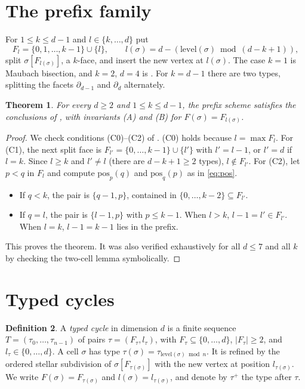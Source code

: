 \documentclass[11pt]{article}
\theoremstyle{plain}
\newtheorem{theorem}{Theorem}[section]
\theoremstyle{definition}
\newtheorem{definition}[theorem]{Definition}
\theoremstyle{remark}
\newcommand{\level}{\mathrm{level}}
\newcommand{\pos}{\mathrm{pos}}
\begin{document}
\section{The prefix family}\label{sec:prefix}

For $1\le k\le d-1$ and $l\in\{k,\dots,d\}$ put
\[
  F_l=\{0,1,\dots,k-1\}\cup\{l\},\qquad l(\sigma)=d-(\level(\sigma)\bmod(d-k+1)),
\]
split $\sigma[F_{l(\sigma)}]$, a $k$-face, and insert the new vertex at
$l(\sigma)$. The case $k=1$ is Maubach bisection, and $k=2$, $d=4$ is
. For $k=d-1$ there are two types, splitting the facets
$\partial_{d-1}$ and $\partial_d$ alternately.

\begin{theorem}\label{thm:prefix}
For every $d\ge2$ and $1\le k\le d-1$, the prefix scheme satisfies the
conclusions of , with invariants (A) and (B) for
$F(\sigma)=F_{l(\sigma)}$.
\end{theorem}

\begin{proof}
We check conditions (C0)--(C2) of . (C0) holds because
$l=\max F_l$. For (C1), the next split face is
$F_{l'}=\{0,\dots,k-1\}\cup\{l'\}$ with $l'=l-1$, or $l'=d$ if $l=k$.
Since $l\ge k$ and $l'\ne l$ (there are $d-k+1\ge2$ types), $l\notin F_{l'}$.
For (C2), let $p<q$ in $F_l$ and compute $\pos_p(q)$ and $\pos_q(p)$ as
in \eqref{eq:pos}.
\begin{itemize}
\item If $q<k$, the pair is $\{q-1,p\}$, contained in
  $\{0,\dots,k-2\}\subseteq F_{l'}$.
\item If $q=l$, the pair is $\{l-1,p\}$ with $p\le k-1$. When $l>k$,
  $l-1=l'\in F_{l'}$. When $l=k$, $l-1=k-1$ lies in the prefix.
\end{itemize}
This proves the theorem. It was also verified exhaustively for all
$d\le7$ and all $k$ by checking the two-cell lemma symbolically.
\end{proof}

\section{Typed cycles}\label{sec:cycles}

\begin{definition}
A \emph{typed cycle} in dimension $d$ is a finite sequence
$T=(\tau_0,\dots,\tau_{n-1})$ of pairs $\tau=(F_\tau,l_\tau)$, with
$F_\tau\subseteq\{0,\dots,d\}$, $|F_\tau|\ge2$, and $l_\tau\in\{0,\dots,d\}$.
A cell $\sigma$ has type $\tau(\sigma)=\tau_{\level(\sigma)\bmod n}$. It is
refined by the ordered stellar subdivision of $\sigma[F_{\tau(\sigma)}]$
with the new vertex at position $l_{\tau(\sigma)}$. We write
$F(\sigma)=F_{\tau(\sigma)}$ and $l(\sigma)=l_{\tau(\sigma)}$, and denote by
$\tau^+$ the type after $\tau$.
\end{definition}
\end{document}
